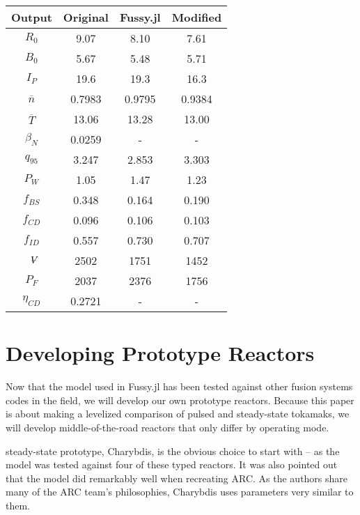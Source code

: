 \begin{table}[b!]
\begin{subtable}[t]{0.5\textwidth}
\begin{tabular}{ c|c|c|c }
Output           & Original         & Fussy.jl  & Modified      \\
\hline
$R_{0}$          & 9.07            & 8.10   & 7.61           \\
$B_{0}$          & 5.67            & 5.48   &  5.71        \\
$I_{P}$          & 19.6             & 19.3 &   16.3       \\
$\overline n$    & 0.7983           & 0.9795 &   0.9384      \\
$\overline T$    & 13.06            & 13.28 & 13.00         \\
$\beta_{N}$       & 0.0259           & - & -         \\
$q_{95}$         & 3.247            & 2.853 & 3.303          \\
$P_{W}$          & 1.05             & 1.47 & 1.23          \\
$f_{BS}$         & 0.348            & 0.164 & 0.190         \\
$f_{CD}$         & 0.096            & 0.106 &  0.103        \\
$f_{ID}$         & 0.557            & 0.730  & 0.707         \\
$\volume$         & 2502           & 1751  & 1452        \\
$P_{F}$          & 2037           & 2376 & 1756         \\
$\eta_{CD}$      & 0.2721           & - & -

\end{tabular}
\end{subtable}
\hfill
\hfill
\label{table:demo_pulsed}
\end{table}

\clearpage

\newpage

\section{Developing Prototype Reactors}

Now that the model used in Fussy.jl has been tested against other fusion systems codes in the field, we will develop our own prototype reactors. Because this paper is about making a levelized comparison of pulsed and steady-state tokamaks, we will develop middle-of-the-road reactors that only differ by operating mode. 

 steady-state prototype, Charybdis, is the obvious choice to start with -- as the model was tested against four of these typed reactors. It was also pointed out that the model did remarkably well when recreating ARC. As the authors share many of the ARC team's philosophies, Charybdis uses  parameters very similar to them.\cite{arc}

